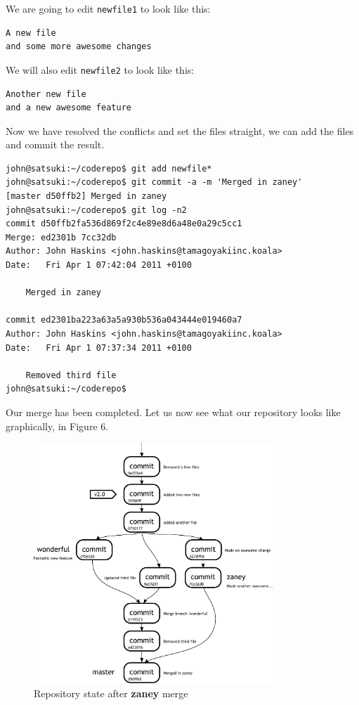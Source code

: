 We are going to edit \texttt{newfile1} to look like this:

\begin{Verbatim}
A new file
and some more awesome changes
\end{Verbatim}

We will also edit \texttt{newfile2} to look like this:

\begin{Verbatim}
Another new file
and a new awesome feature
\end{Verbatim}

Now we have resolved the conflicts and set the files straight, we can add the files and commit the result.

\begin{Verbatim}
john@satsuki:~/coderepo$ git add newfile*
john@satsuki:~/coderepo$ git commit -a -m 'Merged in zaney'
[master d50ffb2] Merged in zaney
john@satsuki:~/coderepo$ git log -n2
commit d50ffb2fa536d869f2c4e89e8d6a48e0a29c5cc1
Merge: ed2301b 7cc32db
Author: John Haskins <john.haskins@tamagoyakiinc.koala>
Date:   Fri Apr 1 07:42:04 2011 +0100

    Merged in zaney

commit ed2301ba223a63a5a930b536a043444e019460a7
Author: John Haskins <john.haskins@tamagoyakiinc.koala>
Date:   Fri Apr 1 07:37:34 2011 +0100

    Removed third file
john@satsuki:~/coderepo$ 
\end{Verbatim}

Our merge has been completed.  Let us now see what our repository looks like graphically, in Figure 6.

\begin{figure}[hbt]
\centering
\includegraphics[width=9cm]{images/f-w4-d6.pdf}
\caption{Repository state after \textbf{zaney} merge}
\end{figure}


